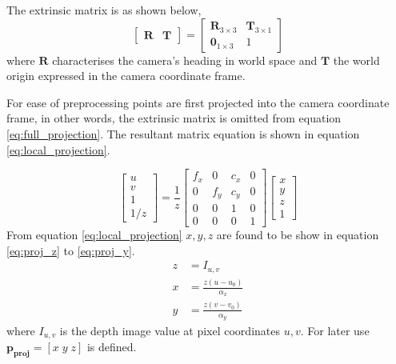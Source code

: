 The extrinsic matrix is as shown below,
\begin{equation}\label{eq:extrinsic}
    \begin{bmatrix}
        \boldsymbol{R} & \boldsymbol{T}
    \end{bmatrix}
    =
    \begin{bmatrix}
        \boldsymbol{R}_{3\times3} & \boldsymbol{T}_{3\times1} \\
        \boldsymbol{0}_{1\times3} & 1
    \end{bmatrix}
\end{equation}
where \(\boldsymbol{R}\) characterises the camera's heading in world space and \(\boldsymbol{T}\) the world origin expressed in 
the camera coordinate frame.

For ease of preprocessing points are first projected into the camera coordinate frame, in other words, the extrinsic matrix is omitted from equation \ref{eq:full_projection}.
The resultant matrix equation is shown in equation \ref{eq:local_projection}.

\begin{equation} \label{eq:local_projection}
    \begin{bmatrix}
        u \\
        v \\
        1 \\
        1/z
    \end{bmatrix}
    = \frac{1}{z}
    \begin{bmatrix}
        f_x & 0 & c_x & 0 \\
        0 & f_y & c_y & 0 \\
        0 & 0 & 1 & 0 \\
        0 & 0 & 0 & 1
    \end{bmatrix}
    \begin{bmatrix}
        x\\
        y\\
        z\\
        1
    \end{bmatrix}
\end{equation}
From equation \ref{eq:local_projection} \(x,y,z\) are found to be show in equation \ref{eq:proj_z} to \ref{eq:proj_y}.
\begin{align}
    z &= I_{u,v} \label{eq:proj_z}\\[0.2cm]
    x &= \frac{z(u - u_0)}{\alpha_x}\label{eq:proj_x} \\
    y &= \frac{z(v - v_0)}{\alpha_y}\label{eq:proj_y}
\end{align}
where \(I_{u,v}\) is the depth image value at pixel coordinates \(u,v\). For later use \(\boldsymbol{p_{proj}} = [x \; y \; z]\) is defined.

